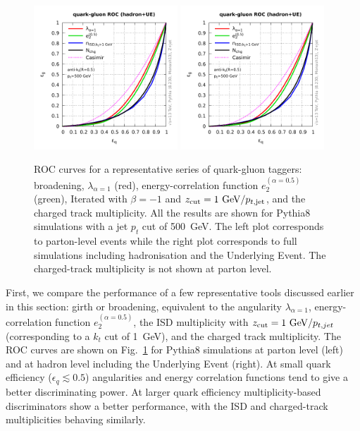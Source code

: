 \begin{figure}[t]
  \includegraphics[width=0.48\textwidth,page=3]{figures/qg-rocs.pdf}%
  \hfill%
  \includegraphics[width=0.48\textwidth,page=1]{figures/qg-rocs.pdf}
  \caption{ROC curves for a representative series of quark-gluon
    taggers: broadening, $\lambda_{\alpha=1}$ (red),
    energy-correlation function $e_2^{(\alpha=0.5)}$ (green), Iterated
    \SD with $\beta=-1$ and $z_{\text{cut}}=1~\text{GeV}/p_{t,\text{jet}}$, and the
    charged track multiplicity. All the results are shown for Pythia8
    simulations with a jet $p_t$ cut of 500~GeV. The left plot
    corresponds to parton-level events while the right plot
    corresponds to full simulations including hadronisation and the
    Underlying Event. The charged-track multiplicity is not shown at 
    parton level.}\label{fig:qg-roc-summary}
\end{figure}

First, we compare the performance of a few representative tools
discussed earlier in this section: girth or broadening, equivalent to
the angularity $\lambda_{\alpha=1}$, energy-correlation function
$e_2^{(\alpha=0.5)}$, the ISD multiplicity with
$z_{\text{cut}}=1~\text{GeV}/p_{t,jet}$ (corresponding to a $k_t$ cut of
1~GeV), and the charged track multiplicity.
%
The ROC curves are shown on Fig.~\ref{fig:qg-roc-summary} for Pythia8
simulations at parton level (left) and at hadron level including the
Underlying Event (right).
%
At small quark efficiency ($\epsilon_q\lesssim 0.5$) angularities and
energy correlation functions tend to give a better discriminating
power. At larger quark efficiency multiplicity-based discriminators show a better performance, with the
ISD and charged-track multiplicities behaving similarly.

